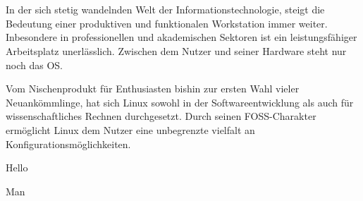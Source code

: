 \section{}

In der sich stetig wandelnden Welt der Informationstechnologie, steigt die Bedeutung einer produktiven und funktionalen Workstation immer weiter. Inbesondere in professionellen und akademischen Sektoren ist ein leistungsfähiger Arbeitsplatz unerlässlich. Zwischen dem Nutzer und seiner Hardware steht nur noch das \Gls{OS}.

Vom Nischenprodukt für Enthusiasten bishin zur ersten Wahl vieler Neuankömmlinge, hat sich Linux sowohl in der Softwareentwicklung als auch für wissenschaftliches Rechnen durchgesetzt. Durch seinen \gls{FOSS}-Charakter ermöglicht Linux dem Nutzer eine unbegrenzte vielfalt an Konfigurationsmöglichkeiten.


Hello

Man